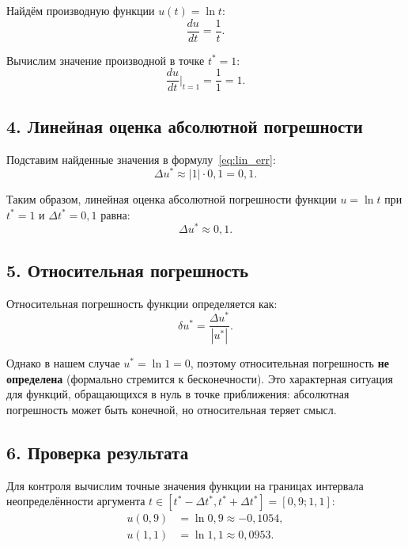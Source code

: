 \documentclass{article}
\begin{document}
Найдём производную функции $u(t) = \ln t$:
\begin{equation}
\frac{du}{dt} = \frac{1}{t}.
\end{equation}

Вычислим значение производной в точке $t^* = 1$:
\begin{equation}
\frac{du}{dt}\bigg|_{t = 1} = \frac{1}{1} = 1.
\end{equation}

\subsection*{4. Линейная оценка абсолютной погрешности}

Подставим найденные значения в формулу~\eqref{eq:lin_err}:
\begin{equation}
\Delta u^* \approx |1| \cdot 0{,}1 = 0{,}1.
\end{equation}

Таким образом, линейная оценка абсолютной погрешности функции $u = \ln t$ при $t^* = 1$ и $\Delta t^* = 0{,}1$ равна:
\begin{equation}
\boxed{\Delta u^* \approx 0{,}1.}
\end{equation}

\subsection*{5. Относительная погрешность}

Относительная погрешность функции определяется как:
\begin{equation}
\delta u^* = \frac{\Delta u^*}{|u^*|}.
\end{equation}

Однако в нашем случае $u^* = \ln 1 = 0$, поэтому относительная погрешность \textbf{не определена} (формально стремится к бесконечности). Это характерная ситуация для функций, обращающихся в нуль в точке приближения: абсолютная погрешность может быть конечной, но относительная теряет смысл.

\subsection*{6. Проверка результата}

Для контроля вычислим точные значения функции на границах интервала неопределённости аргумента $t \in [t^* - \Delta t^*, t^* + \Delta t^*] = [0{,}9; 1{,}1]$:
\begin{align}
u(0{,}9) &= \ln 0{,}9 \approx -0{,}1054, \\
u(1{,}1) &= \ln 1{,}1 \approx 0{,}0953.
\end{align}
\end{document}
